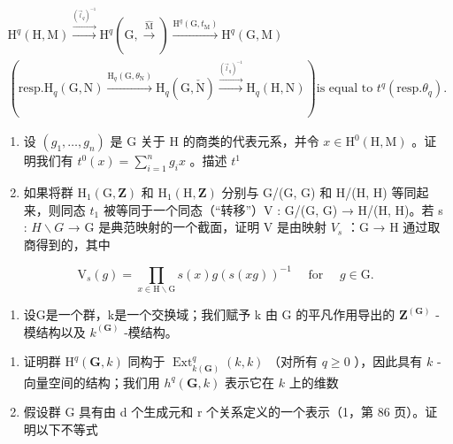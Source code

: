 \[
\begin{array}{c} \mathrm{H} ^ {q} (\mathrm{H}, \mathrm{M}) \xrightarrow {\stackrel {{(\vec {l} _ {q}) ^ {- 1}}} {{\longrightarrow}}} \mathrm{H} ^ {q} (\mathrm{G}, \stackrel {{\hat {\mathrm{M}}}} {{\longrightarrow}}) \xrightarrow {\mathrm{H} ^ {q} (\mathrm{G} , t _ {\mathrm{M}})} \mathrm{H} ^ {q} (\mathrm{G}, \mathrm{M}) \\ (\text {resp.} \mathrm{H} _ {q} (\mathrm{G}, \mathrm{N}) \xrightarrow {\mathrm{H} _ {q} (\mathrm{G} , \theta_ {\mathrm{N}})} \mathrm{H} _ {q} (\mathrm{G}, \check {\mathrm{N}}) \xrightarrow {\stackrel {{(\vec {l} _ {q}) ^ {- 1}}} {{\longrightarrow}}} \mathrm{H} _ {q} (\mathrm{H}, \mathrm{N})) \text {is equal to } t ^ {q} (\text {resp.} \theta_ {q}). \end{array}
\]

\begin{enumerate}
\def\labelenumi{\alph{enumi})}
\setcounter{enumi}{4}
\item
  设 \((g_{1},\ldots ,g_{n})\) 是 G 关于 H 的商类的代表元系，并令 \(x\in \mathrm{H}^0 (\mathrm{H},\mathrm{M})\) 。证明我们有 \(t^0 (x) = \sum_{i = 1}^{n}g_{i}x\) 。描述 \(t^1\)
\item
  如果将群 \(\mathrm{H}_{1}(\mathrm{G},\mathbf{Z})\) 和 \(\mathrm{H}_{1}(\mathrm{H},\mathbf{Z})\) 分别与 G/(G, G) 和 H/(H, H) 等同起来，则同态 \(t_{1}\) 被等同于一个同态（“转移”）V : G/(G, G) → H/(H, H)。若 s : \(H \backslash G\) → G 是典范映射的一个截面，证明 V 是由映射 \(V_{s}\) ：G → H 通过取商得到的，其中
\end{enumerate}

\[
\mathrm{V} _ {s} (g) = \prod_ {x \in \mathrm{H} \backslash \mathrm{G}} s (x) g (s (x g)) ^ {- 1} \quad \text { for } \quad g \in \mathrm{G}.
\]

\begin{enumerate}
\def\labelenumi{\arabic{enumi})}
\setcounter{enumi}{14}
\tightlist
\item
  设G是一个群，k是一个交换域；我们赋予 k 由 G 的平凡作用导出的 \(\mathbf{Z}^{(\mathbf{G})}\) -模结构以及 \(k^{(\mathbf{G})}\) -模结构。
\end{enumerate}

\begin{enumerate}
\def\labelenumi{\alph{enumi})}
\item
  证明群 \(\mathrm{H}^q (\mathbf{G},k)\) 同构于 \(\operatorname {Ext}_{k(\mathbf{G})}^{q}(k,k)\) （对所有 \(q\geqslant 0\) ），因此具有 \(k\) -向量空间的结构；我们用 \(h^q (\mathbf{G},k)\) 表示它在 \(k\) 上的维数
\item
  假设群 G 具有由 d 个生成元和 r 个关系定义的一个表示（1，第 86 页）。证明以下不等式
\end{enumerate}

